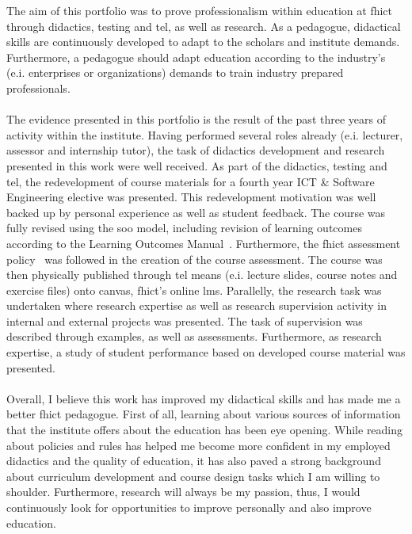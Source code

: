 The aim of this portfolio was to prove professionalism within education at \acrshort{fhict} through didactics, testing and \acrshort{tel}, as well as research. 
As a pedagogue, didactical skills are continuously developed to adapt to the scholars and institute demands. 
Furthermore, a pedagogue should adapt education according to the industry's (e.i. enterprises or organizations) demands to train industry prepared professionals.
\\\\
The evidence presented in this portfolio is the result of the past three years of activity within the institute. Having performed several roles already (e.i. lecturer, assessor and internship tutor), the task of didactics development and research presented in this work were well received. 
As part of the didactics, testing and \acrshort{tel}, the redevelopment of course materials for a fourth year ICT \& Software Engineering elective was presented. 
This redevelopment motivation was well backed up by personal experience as well as student feedback. 
The course was fully revised using the \acrshort{soo} model, including revision of learning outcomes according to the Learning Outcomes Manual~\cite{learningoutcomesmanual}.
Furthermore, the \acrshort{fhict} assessment policy~\cite{FHICTAssesmentPolicy} was followed in the creation of the course assessment. 
The course was then physically published through \acrshort{tel} means (e.i. lecture slides, course notes and exercise files) onto \gls{canvas}, \acrshort{fhict}'s online \acrshort{lms}.
Parallelly, the research task was undertaken where research expertise as well as research supervision activity in internal and external projects was presented. The task of supervision was described through examples, as well as assessments. Furthermore, as research expertise, a study of student performance based on developed course material was presented. 
\\\\
Overall, I believe this work has improved my didactical skills and has made me a better \acrshort{fhict} pedagogue. First of all, learning about various sources of information that the institute offers about the education has been eye opening. While reading about policies and rules has helped me become more confident in my employed didactics and the quality of education, it has also paved a strong background about curriculum development and course design tasks which I am willing to shoulder. Furthermore, research will always be my passion, thus, I would continuously look for opportunities to improve personally and also improve education.